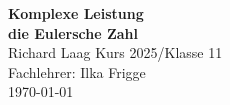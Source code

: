 \begin{titlepage}
  \thispagestyle{empty}
  \begin{center}
        \vspace*{1cm}
        \huge
        \textbf{Komplexe Leistung}\\
        \vspace{0.5cm}
        \Huge
        \textbf{die Eulersche Zahl\\}
        \vspace{1.5cm}
        \Large
        Richard Laag
        \vfill
        Kurs 2025/Klasse 11\\
        Fachlehrer: Ilka Frigge\\
        \today
            
    \end{center}
  \end{titlepage}
\newpage
